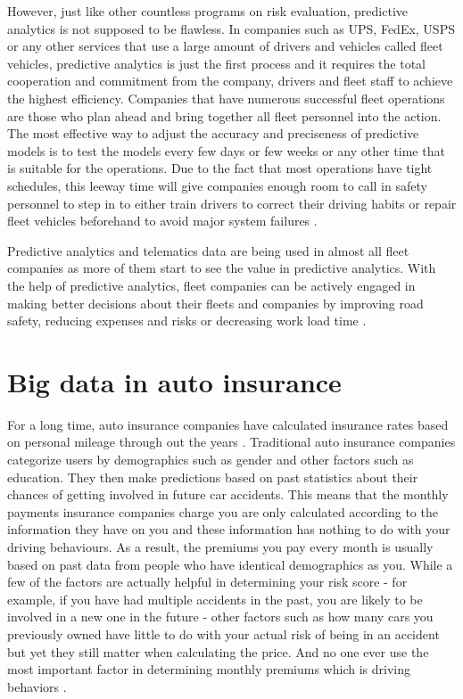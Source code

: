 However, just like other countless programs on risk evaluation, predictive analytics is not supposed to be flawless. In companies such as UPS, FedEx, USPS or any other services that use a large amount of drivers and vehicles called fleet vehicles, predictive analytics is just the first process and it requires the total cooperation and commitment from the company, drivers and fleet staff to achieve the highest efficiency. Companies that have numerous successful fleet operations are those who plan ahead and bring together all fleet personnel into the action. The most effective way to adjust the accuracy and preciseness of predictive models is to test the models every few days or few weeks or any other time that is suitable for the operations. Due to the fact that most operations have tight schedules, this leeway time will give companies enough room to call in safety personnel to step in to either train drivers to correct their driving habits or repair fleet vehicles beforehand to avoid major system failures \cite{Suizo2015decisions}.

Predictive analytics and telematics data are being used in almost all fleet companies as more of them start to see the value in predictive analytics. With the help of predictive analytics, fleet companies can be actively engaged in making better decisions about their fleets and companies by improving road safety, reducing expenses and risks or decreasing work load time \cite{Suizo2015decisions}.

\section{Big data in auto insurance}

For a long time, auto insurance companies have calculated insurance rates based on personal mileage through out the years \cite{Fung2016turn}. Traditional auto insurance companies categorize users by demographics such as gender and other factors such as education. They then make predictions based on past statistics about their chances of getting involved in future car accidents. This means that the monthly payments insurance companies charge you are only calculated according to the information they have on you and these information has nothing to do with your driving behaviours. As a result, the premiums you pay every month is usually based on past data from people who have identical demographics as you. While a few of the factors are actually helpful in determining your risk score - for example, if you have had multiple accidents in the past, you are likely to be involved in a new one in the future - other factors such as how many cars you previously owned have little to do with your actual risk of being in an accident but yet they still matter when calculating the price. And no one ever use the most important factor in determining monthly premiums which is driving behaviors \cite{Rippe2017unfair}.

